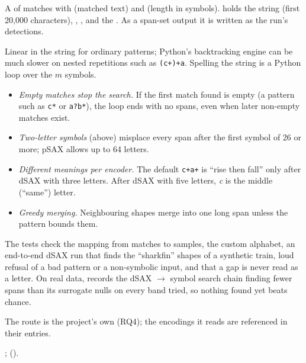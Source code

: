 A  of matches with  (matched text) and  (length in
symbols).  holds the string (first 20{,}000 characters), ,
,  and the . As a span-set output it
is written as the run's detections.

Linear in the string for ordinary patterns; Python's backtracking engine can be much slower
on nested repetitions such as \texttt{(c+)+a}. Spelling the string is a Python loop over the
$m$ symbols.

\begin{itemize}
\item \emph{Empty matches stop the search.} If the first match found is empty (a pattern
  such as \texttt{c*} or \texttt{a?b*}), the loop ends with no spans, even when later
  non-empty matches exist.
\item \emph{Two-letter symbols} (above) misplace every span after the first symbol of 26 or
  more; pSAX allows up to 64 letters.
\item \emph{Different meanings per encoder.} The default \texttt{c+a+} is ``rise then
  fall'' only after dSAX with three letters. After dSAX with five letters, \emph{c} is the
  middle (``same'') letter.
\item \emph{Greedy merging.} Neighbouring shapes merge into one long span unless the
  pattern bounds them.
\end{itemize}

The tests check the mapping from matches to samples, the custom alphabet, an end-to-end
dSAX run that finds the ``sharkfin'' shapes of a synthetic train, loud refusal of a bad
pattern or a non-symbolic input, and that a gap is never read as a letter. On real data,
 records the dSAX $\to$ symbol search chain
finding fewer spans than its surrogate nulls on every band tried, so nothing found yet
beats chance.

The route is the project's own (RQ4); the encodings it reads are referenced in their
entries.

; 
().

